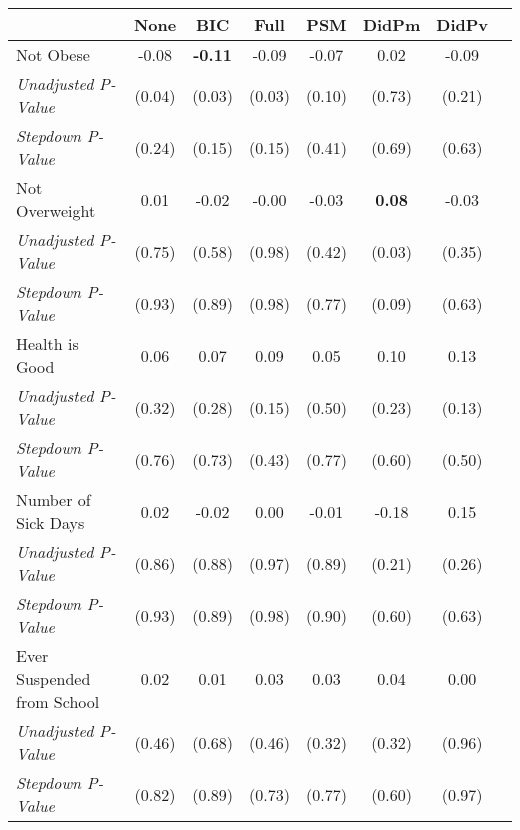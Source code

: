 \begin{tabular}{l c c c c c c c}
\toprule
 & None & BIC & Full & PSM & DidPm & DidPv \\
\midrule
Not Obese & -0.08 & \textbf{ -0.11 } & -0.09 & -0.07 & 0.02 & -0.09 \\
\quad \textit{Unadjusted P-Value} & (0.04) & (0.03) & (0.03) & (0.10) & (0.73) & (0.21) \\
\quad \textit{Stepdown P-Value} & (0.24) & (0.15) & (0.15) & (0.41) & (0.69) & (0.63) \\
Not Overweight & 0.01 & -0.02 & -0.00 & -0.03 & \textbf{ 0.08 } & -0.03 \\
\quad \textit{Unadjusted P-Value} & (0.75) & (0.58) & (0.98) & (0.42) & (0.03) & (0.35) \\
\quad \textit{Stepdown P-Value} & (0.93) & (0.89) & (0.98) & (0.77) & (0.09) & (0.63) \\
Health is Good & 0.06 & 0.07 & 0.09 & 0.05 & 0.10 & 0.13 \\
\quad \textit{Unadjusted P-Value} & (0.32) & (0.28) & (0.15) & (0.50) & (0.23) & (0.13) \\
\quad \textit{Stepdown P-Value} & (0.76) & (0.73) & (0.43) & (0.77) & (0.60) & (0.50) \\
Number of Sick Days & 0.02 & -0.02 & 0.00 & -0.01 & -0.18 & 0.15 \\
\quad \textit{Unadjusted P-Value} & (0.86) & (0.88) & (0.97) & (0.89) & (0.21) & (0.26) \\
\quad \textit{Stepdown P-Value} & (0.93) & (0.89) & (0.98) & (0.90) & (0.60) & (0.63) \\
Ever Suspended from School & 0.02 & 0.01 & 0.03 & 0.03 & 0.04 & 0.00 \\
\quad \textit{Unadjusted P-Value} & (0.46) & (0.68) & (0.46) & (0.32) & (0.32) & (0.96) \\
\quad \textit{Stepdown P-Value} & (0.82) & (0.89) & (0.73) & (0.77) & (0.60) & (0.97) \\
\bottomrule
\end{tabular}
